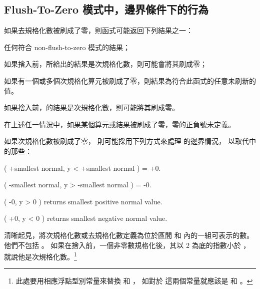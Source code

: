 \subsection[sec:ftzmECB]{Flush-To-Zero 模式中，邊界條件下的行為}

如果去規格化數被刷成了零，則函式可能返回下列結果之一：
\startigNum
\item[item:nftz]任何符合 non-flush-to-zero 模式的結果；

\item 如果捨入前，所給出的結果是次規格化數，則可能會將其刷成零；

\item[item:nfcr] 如果有一個或多個次規格化算元被刷成了零，則結果為符合此函式的任意未刷新的值。

\item 如果捨入前，的結果是次規格化數，則可能將其刷成零。
\stopigNum

在上述任一情況中，如果某個算元或結果被刷成了零，零的正負號未定義。

如果次規格化數被刷成了零，
則可能採用下列方式來處理  的邊界情況，
以取代中的那些：

\startEnglishWithoutWhiteSpace
\setupnarrower[left=2em,right=0em]
 ( +smallest normal, y < +smallest normal ) = +0.\par
{} ( -smallest normal, y > -smallest normal ) = -0.\par
{} ( -0, y > 0 ) returns smallest positive normal value.\par
{} ( +0, y < 0 ) returns smallest negative normal value.\par
\stopnarrower
\stopEnglishWithoutWhiteSpace

清晰起見，將次規格化數或去規格化數定義為位於區間 
和  內的一組可表示的數。
他們不包括 。
如果在捨入前，一個非零數規格化後，其以 2 為底的指數小於 ，
就說他是次規格化數。\footnote{%
此處要用相應浮點型別常量來替換  和 ，
如對於  這兩個常量就應該是  和 。}

